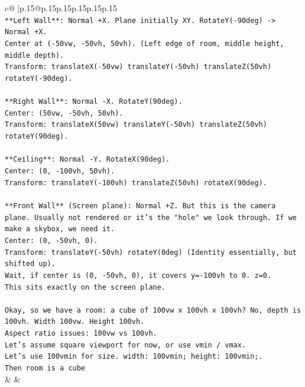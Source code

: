 \documentclass{article}
\begin{document}
{\begin{supertabular}{c@{$\;$}|p{.15\linewidth}@{}p{.15\linewidth}p{.15\linewidth}p{.15\linewidth}p{.15\linewidth}p{.15\linewidth}}
{{{\\ 
\texttt{**Left Wall**: Normal +X. Plane initially XY. RotateY({-}90deg) {-}> Normal +X.} \\
\texttt{Center at ({-}50vw, {-}50vh, 50vh). (Left edge of room, middle height, middle depth).} \\
\texttt{Transform: translateX({-}50vw) translateY({-}50vh) translateZ(50vh) rotateY({-}90deg).} \\
\\ 
\texttt{**Right Wall**: Normal {-}X. RotateY(90deg).} \\
\texttt{Center: (50vw, {-}50vh, 50vh).} \\
\texttt{Transform: translateX(50vw) translateY({-}50vh) translateZ(50vh) rotateY(90deg).} \\
\\ 
\texttt{**Ceiling**: Normal {-}Y. RotateX(90deg).} \\
\texttt{Center: (0, {-}100vh, 50vh).} \\
\texttt{Transform: translateY({-}100vh) translateZ(50vh) rotateX(90deg).} \\
\\ 
\texttt{**Front Wall** (Screen plane): Normal +Z. But this is the camera plane. Usually not rendered or it's the "hole" we look through. If we make a skybox, we need it.} \\
\texttt{Center: (0, {-}50vh, 0).} \\
\texttt{Transform: translateY({-}50vh) rotateY(0deg) (Identity essentially, but shifted up).} \\
\texttt{Wait, if center is (0, {-}50vh, 0), it covers y={-}100vh to 0. z=0.} \\
\texttt{This sits exactly on the screen plane.} \\
\\ 
\texttt{Okay, so we have a room: a cube of 100vw x 100vh x 100vh? No, depth is 100vh. Width 100vw. Height 100vh.} \\
\texttt{Aspect ratio issues: 100vw vs 100vh.} \\
\texttt{Let's assume square viewport for now, or use vmin / vmax.} \\
\texttt{Let's use 100vmin for size. width: 100vmin; height: 100vmin;.} \\
\texttt{Then room is a cube} \\
            }
        }
    }
    & & \\ \\


\end{supertabular}}
\end{document}
